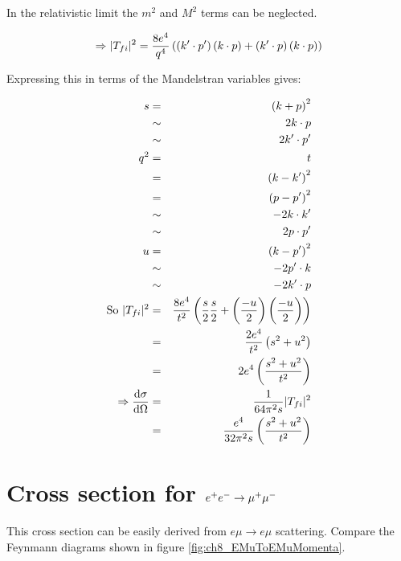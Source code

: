 In the relativistic limit the $m^2$ and $M^2$ terms can be neglected.

\[
  \Rightarrow |T_{fi}|^2 = \frac{8e^4}{q^4}\left(\left(k'\cdot p'\right)\left(k\cdot p\right) + \left(k'\cdot p\right)\left(k\cdot p\right)\right)
\]

Expressing this in terms of the Mandelstran variables gives:

\begin{eqnarray*}
  s   & =    & \left(k + p\right)^2 \\
      & \sim & 2k\cdot p \\
      & \sim & 2k'\cdot p' \\
  q^2 & =    & t \\
      & =    & \left(k - k'\right)^2 \\
      & =    & \left(p - p'\right)^2 \\
      & \sim & -2k\cdot k' \\
      & \sim &  2p\cdot p' \\
  u   & =    & \left(k - p'\right)^2 \\
      & \sim & -2p'\cdot k \\
      & \sim & -2k'\cdot p \\
  \textrm{So } |T_{fi}|^2 & = & \frac{8e^4}{t^2}\left(\frac{s}{2}\frac{s}{2} + \left(\frac{-u}{2}\right)\left(\frac{-u}{2}\right)\right) \\
  & = & \frac{2e^4}{t^2}\left(s^2 + u^2\right) \\
  & = & 2e^4\left(\frac{s^2 + u^2}{t^2}\right) \\
  \Rightarrow \frac{\mathrm{d}\sigma}{\mathrm{d}\Omega} & = & \frac{1}{64\pi^2s}|T_{fi}|^2 \\
  & = & \frac{e^4}{32\pi^2s}\left(\frac{s^2 + u^2}{t^2}\right)
\end{eqnarray*}

\section{Cross section for \texorpdfstring{$e^+e^- \to \mu^+\mu^-$}{EEToMuMu}}

This cross section can be easily derived from $e \mu \to e \mu$ scattering.  Compare the Feynmann diagrams shown in figure \ref{fig:ch8_EMuToEMuMomenta}.

